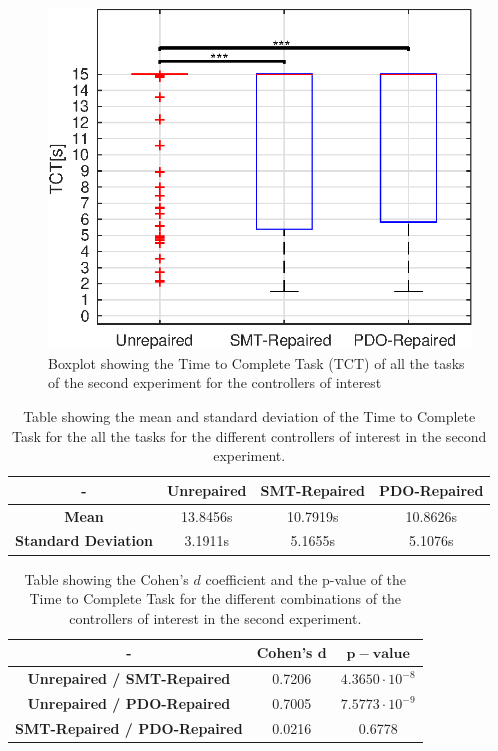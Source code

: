 \begin{figure}[H]
    \centering
    \includegraphics[width=\textwidth]{Images/second-experiment/exp1_TCT.eps}
    \caption{Boxplot showing the Time to Complete Task (TCT) of all the tasks of the second experiment for the controllers of interest}
    \label{fig:box-TCT-all-second}
\end{figure}
\begin{table}[H]
    \centering
    \begin{tabular}{|c|c|c|c|}
        \hline
        - & \textbf{Unrepaired} & \textbf{SMT-Repaired} & \textbf{PDO-Repaired} \\
        \hline
        \textbf{Mean} & 13.8456s & 10.7919s & 10.8626s \\
        \textbf{Standard Deviation} & 3.1911s & 5.1655s & 5.1076s \\
        \hline
    \end{tabular}
    \caption{Table showing the mean and standard deviation of the Time to Complete Task for the all the tasks for the different controllers of interest in the second experiment.}
    \label{tab:TCT-all-second-mean-std}
\end{table}
\begin{table}[H]
    \centering
    \begin{tabular}{|c|c|c|}
        \hline
        - & \textbf{Cohen's} $\mathbf{d}$ & $\mathbf{p-value}$ \\
        \hline
        \textbf{Unrepaired / SMT-Repaired} & 0.7206 & $4.3650 \cdot 10^{-8}$ \\
        \textbf{Unrepaired / PDO-Repaired} & 0.7005 & $7.5773 \cdot 10^{-9}$ \\
        \textbf{SMT-Repaired / PDO-Repaired} & 0.0216 & 0.6778 \\
        \hline
    \end{tabular}
    \caption{Table showing the Cohen's $d$ coefficient and the p-value of the Time to Complete Task for the different combinations of the controllers of interest in the second experiment.}
    \label{tab:TCT-all-second-cohen-p}
\end{table}
%
%
%
%
%

